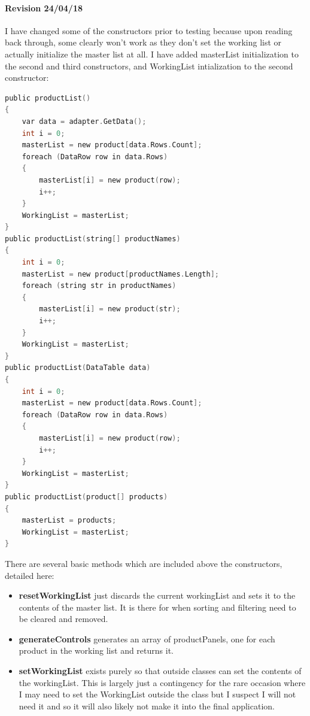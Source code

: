 ﻿\documentclass{article}
\begin{document}
    \paragraph{Revision 24/04/18}
    I have changed some of the constructors prior to testing because upon reading back through, some clearly won't work as they don't set the working list or actually initialize the master list at all.
    I have added masterList initialization to the second and third constructors, and WorkingList intialization to the second constructor:
    \begin{lstlisting}[language=C]
public productList()
{
    var data = adapter.GetData();
    int i = 0;
    masterList = new product[data.Rows.Count];
    foreach (DataRow row in data.Rows)
    {
        masterList[i] = new product(row);
        i++;
    }
    WorkingList = masterList;
}
public productList(string[] productNames)
{
    int i = 0;
    masterList = new product[productNames.Length];
    foreach (string str in productNames)
    {
        masterList[i] = new product(str);
        i++;
    }
    WorkingList = masterList;
}
public productList(DataTable data)
{
    int i = 0;
    masterList = new product[data.Rows.Count];
    foreach (DataRow row in data.Rows)
    {
        masterList[i] = new product(row);
        i++;
    }
    WorkingList = masterList;
}
public productList(product[] products)
{
    masterList = products;
    WorkingList = masterList;
}
    \end{lstlisting}
    There are several basic methods which are included above the constructors, detailed here:
    \begin{itemize}
        \item \textbf{resetWorkingList} just discards the current workingList and sets it to the contents of the master list.
        It is there for when sorting and filtering need to be cleared and removed.
        \item \textbf{generateControls} generates an array of productPanels, one for each product in the working list and returns it.
        \item \textbf{setWorkingList} exists purely so that outside classes can set the contents of the workingList.
        This is largely just a contingency for the rare occasion where I may need to set the WorkingList outside the class but I suspect I will not need it and so it will also likely not make it into the final application.
    \end{itemize}
    \newpage
\end{document}
